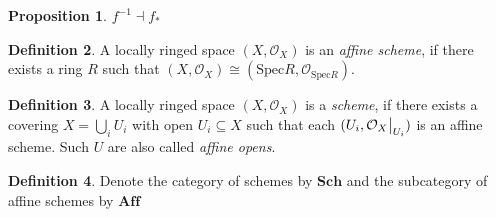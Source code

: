\documentclass{scrartcl}
\newcommand{\Aff}{\mathrm{\textbf{Aff}}}
\newcommand{\Sch}{\mathrm{\textbf{Sch}}}
\newcommand{\Spec}{\mathrm{Spec}}
\renewcommand{\O}{\mathcal{O}}
\newcommand\restr[2]{{
    \left.\kern-\nulldelimiterspace
    #1
    \vphantom{\big|}
    \right|_{#2}
}}
\newtheorem{prop}{Proposition}[section]
\theoremstyle{definition}
\newtheorem{definition}[prop]{Definition}
\begin{document}
\begin{prop}
    $f^{-1} \dashv f_*$
\end{prop}
\begin{definition}
    A locally ringed space $(X, \O_X)$ is an \emph{affine scheme}, if there exists a ring $R$ such that $(X, \O_X) \cong (\Spec R, \O_{\Spec R})$.
\end{definition}
\begin{definition}
    A locally ringed space $(X, \O_X)$ is a \emph{scheme}, if there exists a covering $X = \bigcup_i U_i$ with open $U_i \subseteq X$ such that each $(U_i, \restr{\O_X}{U_i})$ is an affine scheme.
    Such $U$ are also called \emph{affine opens}.
\end{definition}
\begin{definition}
    Denote the category of schemes by $\Sch$ and the subcategory of affine schemes by $\Aff$
\end{definition}
\end{document}
